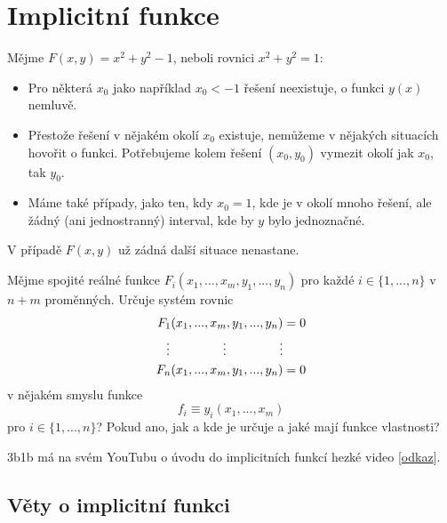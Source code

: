 \documentclass[../main.tex]{subfiles}
\begin{document}
\section{Implicitní funkce}

\begin{example}
	Mějme $F(x,y) = x^2 + y^2 - 1$, neboli rovnici \( x^2 + y^2 = 1 \):
	\begin{itemize}
	    \item Pro některá $x_0$ jako například $x_0 < -1$ řešení neexistuje, o funkci $y(x)$ nemluvě.
	    \item Přestože řešení v nějakém okolí $x_0$ existuje, nemůžeme v nějakých situacích hovořit o funkci. Potřebujeme kolem řešení $(x_0, y_0)$ vymezit okolí jak $x_0$, tak $y_0$.
	    \item Máme také případy, jako ten, kdy $x_0 = 1$, kde je v okolí mnoho řešení, ale žádný (ani jednostranný) interval, kde by $y$ bylo jednoznačné.
	\end{itemize}
	V případě $F(x,y)$ už zádná další situace nenastane.
\end{example}

\begin{example}[Obecný]
	Mějme spojité reálné funkce $F_i(x_1, ... , x_m, y_1, ... , y_n)$ pro každé $i \in \{1, ..., n\}$
	v $n + m$
	proměnných. Určuje systém rovnic
	\[
		\begin{aligned}
			F_1(x_1, ... , x_m, y_1, ... , y_n) &= 0 \\
			\vdots \hspace{15mm} \vdots \hspace{15mm} \vdots \\
			F_n(x_1, ... , x_m, y_1, ... , y_n) &= 0
		\end{aligned}
\]
	v nějakém smyslu funkce
	\[ f_i \equiv y_i(x_1, ... , x_m) \]
	pro $i \in \{ 1, ... , n \}$? Pokud ano, jak a kde je určuje a jaké mají funkce vlastnosti?
\end{example}

\begin{intuition}
	3b1b má na svém YouTubu o úvodu do implicitních funkcí hezké video [\href{https://www.youtube.com/watch?v=qb40J4N1fa4}{odkaz}].
\end{intuition}

\subsection{Věty o implicitní funkci}
\end{document}
